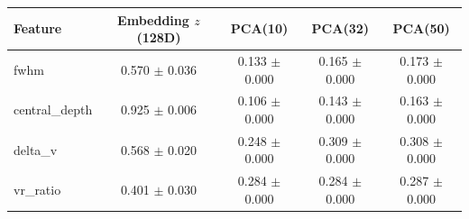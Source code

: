 \begin{tabular}{lcccc}
  \toprule
  Feature & Embedding $z$ (128D) & PCA(10) & PCA(32) & PCA(50) \\
  \midrule
  fwhm                 & 0.570 $\pm$ 0.036 & 0.133 $\pm$ 0.000 & 0.165 $\pm$ 0.000 & 0.173 $\pm$ 0.000 \\
  central\_depth       & 0.925 $\pm$ 0.006 & 0.106 $\pm$ 0.000 & 0.143 $\pm$ 0.000 & 0.163 $\pm$ 0.000 \\
  delta\_v             & 0.568 $\pm$ 0.020 & 0.248 $\pm$ 0.000 & 0.309 $\pm$ 0.000 & 0.308 $\pm$ 0.000 \\
  vr\_ratio            & 0.401 $\pm$ 0.030 & 0.284 $\pm$ 0.000 & 0.284 $\pm$ 0.000 & 0.287 $\pm$ 0.000 \\
  \bottomrule
\end{tabular}

